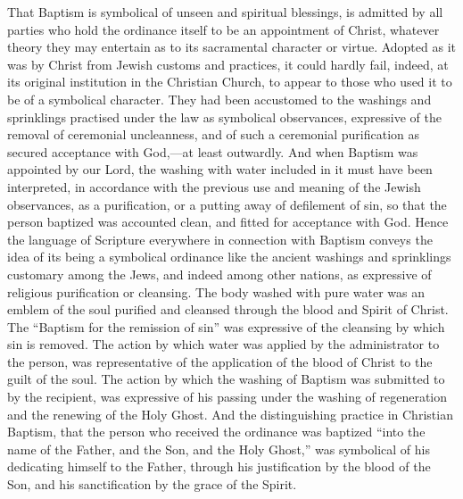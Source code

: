 \documentclass[english,]{book}
\begin{document}
That Baptism is symbolical of unseen and spiritual blessings, is admitted by all parties who hold the ordinance itself to be an appointment of Christ, whatever theory they may entertain as to its sacramental character or virtue. Adopted as it was by Christ from Jewish customs and practices, it could hardly fail, indeed, at its original institution in the Christian Church, to appear to those who used it to be of a symbolical character. They had been accustomed to the washings and sprinklings practised under the law as symbolical observances, expressive of the removal of ceremonial uncleanness, and of such a ceremonial purification as secured acceptance with God,---at least outwardly. And when Baptism was appointed by our Lord, the washing with water included in it must have been interpreted, in accordance with the previous use and meaning of the Jewish observances, as a purification, or a putting away of defilement of sin, so that the person baptized was accounted clean, and fitted for acceptance with God. Hence the language of Scripture everywhere in connection with Baptism conveys the idea of its being a symbolical ordinance like the ancient washings and sprinklings customary among the Jews, and indeed among other nations, as expressive of religious purification or cleansing. The body washed with pure water was an emblem of the soul purified and cleansed through the blood and Spirit of Christ. The ``Baptism for the remission of sin'' was expressive of the cleansing by which sin is removed. The action by which water was applied by the administrator to the person, was representative of the application of the blood of Christ to the guilt of the soul. The action by which the washing of Baptism was submitted to by the recipient, was expressive of his passing under the washing of regeneration and the renewing of the Holy Ghost. And the distinguishing practice in Christian Baptism, that the person who received the ordinance was baptized ``into the name of the Father, and the Son, and the Holy Ghost,'' was symbolical of his dedicating himself to the Father, through his justification by the blood of the Son, and his sanctification by the grace of the Spirit.
\end{document}
